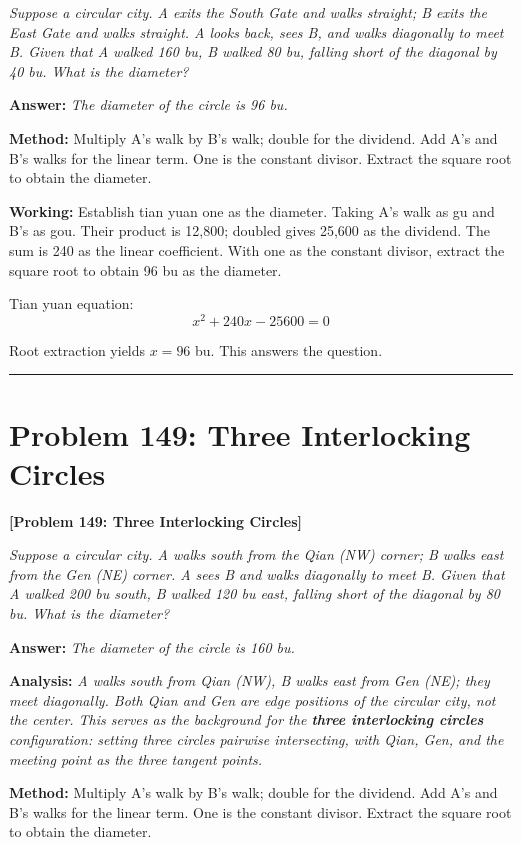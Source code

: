 \documentclass[11pt,a4paper]{book}
\newcommand{\answer}[1]{\noindent\textbf{\color{anacolor}Answer: }\textit{#1}\par}
\newcommand{\method}[1]{\noindent\textbf{\color{methodcolor}Method: }#1\par}
\newcommand{\working}[1]{\noindent\textbf{\color{workcolor}Working: }#1\par}
\newcommand{\analysis}[1]{\noindent\textbf{\color{anacolor}Analysis: }\textit{#1}\par}
\newcommand{\shortline}{\noindent\rule{0.5\textwidth}{0.4pt}\par}
\begin{document}
\textit{Suppose a circular city. A exits the South Gate and walks straight; B exits the East Gate and walks straight. A looks back, sees B, and walks diagonally to meet B. Given that A walked 160 bu, B walked 80 bu, falling short of the diagonal by 40 bu. What is the diameter?}

\answer{The diameter of the circle is 96 bu.}

\method{Multiply A's walk by B's walk; double for the dividend. Add A's and B's walks for the linear term. One is the constant divisor. Extract the square root to obtain the diameter.}

\working{Establish tian yuan one as the diameter. Taking A's walk as gu and B's as gou. Their product is 12,800; doubled gives 25,600 as the dividend. The sum is 240 as the linear coefficient. With one as the constant divisor, extract the square root to obtain 96 bu as the diameter.

Tian yuan equation:
$$x^2 + 240x - 25600 = 0$$

Root extraction yields $x = 96$ bu. This answers the question.}

\shortline

\section{Problem 149: Three Interlocking Circles}
\label{sec:prob149}

\noindent\textbf{\color{probcolor}[Problem 149: Three Interlocking Circles]}

\textit{Suppose a circular city. A walks south from the Qian (NW) corner; B walks east from the Gen (NE) corner. A sees B and walks diagonally to meet B. Given that A walked 200 bu south, B walked 120 bu east, falling short of the diagonal by 80 bu. What is the diameter?}

\answer{The diameter of the circle is 160 bu.}

\analysis{A walks south from Qian (NW), B walks east from Gen (NE); they meet diagonally. Both Qian and Gen are edge positions of the circular city, not the center. This serves as the background for the \textbf{three interlocking circles} configuration: setting three circles pairwise intersecting, with Qian, Gen, and the meeting point as the three tangent points.}

\method{Multiply A's walk by B's walk; double for the dividend. Add A's and B's walks for the linear term. One is the constant divisor. Extract the square root to obtain the diameter.}
\end{document}
